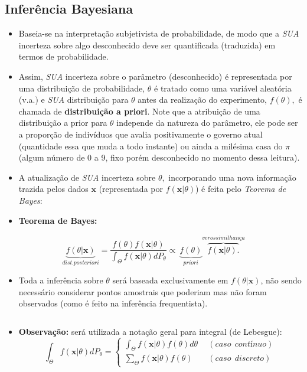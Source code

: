 \documentclass[
]{book}
\providecommand{\tightlist}{%
  \setlength{\itemsep}{0pt}\setlength{\parskip}{0pt}}
\begin{document}
\hypertarget{inferuxeancia-bayesiana}{%
\subsection{Inferência Bayesiana}\label{inferuxeancia-bayesiana}}

\begin{itemize}
\item
  Baseia-se na interpretação subjetivista de probabilidade, de modo que a \emph{SUA} incerteza sobre algo desconhecido deve ser quantificada (traduzida) em termos de probabilidade.
\item
  Assim, \emph{SUA} incerteza sobre o parâmetro (desconhecido) é representada por uma distribuição de probabilidade, \(\theta\) é tratado como uma variável aleatória (v.a.) e \emph{SUA} distribuição para \(\theta\) antes da realização do experimento, \(f(\theta),\) é chamada de \textbf{distribuição a priori}. Note que a atribuição de uma distribuição a prior para \(\theta\) independe da natureza do parâmetro, ele pode ser a proporção de indivíduos que avalia positivamente o governo atual (quantidade essa que muda a todo instante) ou ainda a milésima casa do \(\pi\) (algum número de 0 a 9, fixo porém desconhecido no momento dessa leitura).
\item
  A atualização de \emph{SUA} incerteza sobre \(\theta,\) incorporando uma nova informação trazida pelos dados \(\boldsymbol x\) (representada por \(f(\boldsymbol x| \theta)\)) é feita pelo \emph{Teorema de Bayes}:
\item
  \textbf{Teorema de Bayes:}
\end{itemize}

\[\underbrace{f(\theta| \boldsymbol x)}_{dist. posteriori}=\dfrac{f(\theta)f(\boldsymbol x|\theta)}{\displaystyle \int_{\Theta}f(\boldsymbol x|\theta)dP_\theta} \propto~ \underbrace{f(\theta)}_{priori}\overbrace{f(\boldsymbol x|\theta).}^{verossimilhança}\]

\begin{itemize}
\tightlist
\item
  Toda a inferência sobre \(\theta\) será baseada exclusivamente em \(f(\theta| \boldsymbol x)\), não sendo necessário considerar pontos amostrais que poderiam mas não foram observados (como é feito na inferência frequentista).
\end{itemize}

\(~\)

\begin{itemize}
\tightlist
\item
  \textbf{Observação:} será utilizada a notação geral para integral (de Lebesgue): \[\displaystyle \int_{\Theta}f(\boldsymbol x|\theta)dP_\theta
  = \left\{ \begin{array}{ll} \displaystyle \int_{\Theta}f(\boldsymbol x|\theta) f(\theta) d\theta ~&~ (caso~~contínuo)\\
  \displaystyle \sum_{\Theta}f(\boldsymbol x|\theta) f(\theta) ~&~ (caso~~discreto) \end{array}\right.\]
\end{itemize}
\end{document}
